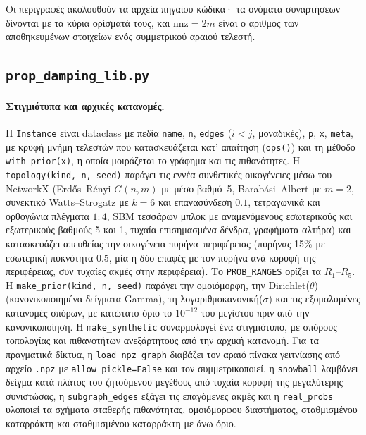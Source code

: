 \documentclass[11pt,a4paper]{article}
\theoremstyle{definition}
\theoremstyle{plain}
\begin{document}
Οι περιγραφές ακολουθούν τα αρχεία πηγαίου κώδικα· τα ονόματα συναρτήσεων δίνονται με τα κύρια ορίσματά τους, και $\mathrm{nnz}=2m$ είναι ο αριθμός των αποθηκευμένων στοιχείων ενός συμμετρικού αραιού τελεστή.

\subsection{\texorpdfstring{\texttt{prop\_damping\_lib.py}}{prop\_damping\_lib.py}}

\paragraph{Στιγμιότυπα και αρχικές κατανομές.} Η \texttt{Instance} είναι dataclass με πεδία \texttt{name}, \texttt{n}, \texttt{edges} ($i<j$, μοναδικές), \texttt{p}, \texttt{x}, \texttt{meta}, με κρυφή μνήμη τελεστών που κατασκευάζεται κατ' απαίτηση (\texttt{ops()}) και τη μέθοδο \texttt{with\_prior(x)}, η οποία μοιράζεται το γράφημα και τις πιθανότητες. Η \texttt{topology(kind, n, seed)} παράγει τις εννέα συνθετικές οικογένειες μέσω του NetworkX (Erdős--Rényi $G(n,m)$ με μέσο βαθμό~5, Barabási--Albert με $m=2$, συνεκτικό Watts--Strogatz με $k=6$ και επανασύνδεση $0.1$, τετραγωνικά και ορθογώνια πλέγματα $1{:}4$, SBM τεσσάρων μπλοκ με αναμενόμενους εσωτερικούς και εξωτερικούς βαθμούς 5 και 1, τυχαία επισημασμένα δένδρα, γραφήματα αλτήρα) και κατασκευάζει απευθείας την οικογένεια πυρήνα--περιφέρειας (πυρήνας 15\% με εσωτερική πυκνότητα $0.5$, μία ή δύο επαφές με τον πυρήνα ανά κορυφή της περιφέρειας, συν τυχαίες ακμές στην περιφέρεια). Το \texttt{PROB\_RANGES} ορίζει τα $R_1$--$R_5$. Η \texttt{make\_prior(kind, n, seed)} παράγει την ομοιόμορφη, την Dirichlet($\theta$) (κανονικοποιημένα δείγματα Gamma), τη λογαριθμοκανονική($\sigma$) και τις εξομαλυμένες κατανομές σπόρων, με κατώτατο όριο το $10^{-12}$ του μεγίστου πριν από την κανονικοποίηση. Η \texttt{make\_synthetic} συναρμολογεί ένα στιγμιότυπο, με σπόρους τοπολογίας και πιθανοτήτων ανεξάρτητους από την αρχική κατανομή. Για τα πραγματικά δίκτυα, η \texttt{load\_npz\_graph} διαβάζει τον αραιό πίνακα γειτνίασης από αρχείο \texttt{.npz} με \texttt{allow\_pickle=False} και τον συμμετρικοποιεί, η \texttt{snowball} λαμβάνει δείγμα κατά πλάτος του ζητούμενου μεγέθους από τυχαία κορυφή της μεγαλύτερης συνιστώσας, η \texttt{subgraph\_edges} εξάγει τις επαγόμενες ακμές και η \texttt{real\_probs} υλοποιεί τα σχήματα σταθερής πιθανότητας, ομοιόμορφου διαστήματος, σταθμισμένου καταρράκτη και σταθμισμένου καταρράκτη με άνω όριο.
\end{document}
